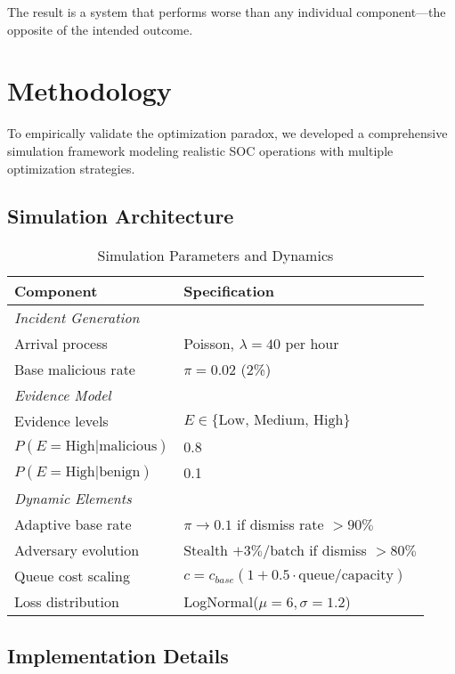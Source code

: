 \documentclass[10pt,conference]{IEEEtran}
\begin{document}
The result is a system that performs worse than any individual component---the opposite of the intended outcome.

\section{Methodology}

To empirically validate the optimization paradox, we developed a comprehensive simulation framework modeling realistic SOC operations with multiple optimization strategies.

\subsection{Simulation Architecture}

\begin{table}[!h]
\centering
\caption{Simulation Parameters and Dynamics}
\footnotesize
\begin{tabular}{@{}ll@{}}
\toprule
\textbf{Component} & \textbf{Specification} \\
\midrule
\multicolumn{2}{l}{\textit{Incident Generation}} \\
Arrival process & Poisson, $\lambda = 40$ per hour \\
Base malicious rate & $\pi = 0.02$ (2\%) \\
\midrule
\multicolumn{2}{l}{\textit{Evidence Model}} \\
Evidence levels & $E \in \{\text{Low, Medium, High}\}$ \\
$P(E = \text{High} | \text{malicious})$ & 0.8 \\
$P(E = \text{High} | \text{benign})$ & 0.1 \\
\midrule
\multicolumn{2}{l}{\textit{Dynamic Elements}} \\
Adaptive base rate & $\pi \to 0.1$ if dismiss rate $> 90\%$ \\
Adversary evolution & Stealth $+3\%$/batch if dismiss $> 80\%$ \\
Queue cost scaling & $c = c_{base}(1 + 0.5 \cdot \text{queue}/\text{capacity})$ \\
Loss distribution & LogNormal($\mu=6, \sigma=1.2$) \\
\bottomrule
\end{tabular}
\end{table}

\subsection{Implementation Details}
\end{document}

